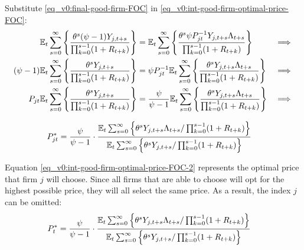 \documentclass[../thesis.tex]{subfiles}
\begin{document}
	
	Substitute \ref{eq_v0:final-good-firm-FOC} in \ref{eq_v0:int-good-firm-optimal-price-FOC}:
	\begin{alignat}{2}
		{\mathbb{E}_{t}} \sum_{s=0}^{\infty} \Bigg\{ \frac{\theta^s (\psi-1) Y_{j,t+s}}{\prod_{k=0}^{s-1}(1+R_{t+k})} \Bigg\} &= {\mathbb{E}_{t}} \sum_{s=0}^{\infty} \Bigg\{ \frac{\theta^s \psi P_{jt}^{-1} Y_{j,t+s} \Lambda_{t+s}}{\prod_{k=0}^{s-1}(1+R_{t+k})}  \Bigg\} &\implies \nonumber \\
		(\psi-1) {\mathbb{E}_{t}} \sum_{s=0}^{\infty} \Bigg\{ \frac{\theta^s Y_{j,t+s}}{\prod_{k=0}^{s-1}(1+R_{t+k})} \Bigg\} &= \psi P_{jt}^{-1} {\mathbb{E}_{t}} \sum_{s=0}^{\infty} \Bigg\{ \frac{\theta^s Y_{j,t+s} \Lambda_{t+s}}{\prod_{k=0}^{s-1}(1+R_{t+k})}  \Bigg\} &\implies \nonumber \\
		P_{jt} {\mathbb{E}_{t}} \sum_{s=0}^{\infty} \Bigg\{ \frac{\theta^s Y_{j,t+s}}{\prod_{k=0}^{s-1}(1+R_{t+k})} \Bigg\} &= \frac{\psi}{\psi-1} {\mathbb{E}_{t}} \sum_{s=0}^{\infty} \Bigg\{ \frac{\theta^s Y_{j,t+s} \Lambda_{t+s}}{\prod_{k=0}^{s-1}(1+R_{t+k})}  \Bigg\} &\implies \nonumber
	\end{alignat}
	
	\vspace*{-1cm}
	
	\begin{align}
		\label{eq_v0:int-good-firm-optimal-price-FOC-2}
		P_{jt}^\ast &= 
		\frac{\psi}{\psi-1} \cdot
		\frac{
			{\mathbb{E}_{t}} \sum_{s=0}^{\infty} \left\{ 
			\theta^s Y_{j,t+s} \Lambda_{t+s} / \prod_{k=0}^{s-1}(1+R_{t+k}) \right\} } {{\mathbb{E}_{t}} \sum_{s=0}^{\infty} \left\{
			\theta^s Y_{j,t+s} / \prod_{k=0}^{s-1}(1+R_{t+k}) \right\}}
	\end{align}
	
	
	Equation \ref{eq_v0:int-good-firm-optimal-price-FOC-2} represents the optimal price that firm $j$ will choose. Since all firms that are able to choose will opt for the highest possible price, they will all select the same price. As a result, the index $j$ can be omitted:
	\begin{align}
		\label{eq_v0:int-good-firm-optimal-price-FOC-3}
		P_t^\ast &= 
		\frac{\psi}{\psi-1} \cdot
		\frac{
			{\mathbb{E}_{t}} \sum_{s=0}^{\infty} \left\{ 
			\theta^s Y_{j,t+s} \Lambda_{t+s} / \prod_{k=0}^{s-1}(1+R_{t+k}) \right\} } {{\mathbb{E}_{t}} \sum_{s=0}^{\infty} \left\{
			\theta^s Y_{j,t+s} / \prod_{k=0}^{s-1}(1+R_{t+k}) \right\}}
	\end{align}
	
\end{document}
